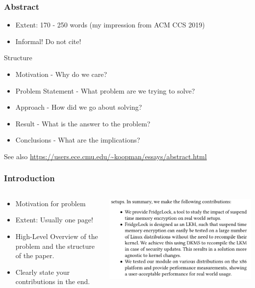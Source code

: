 \documentclass[xcolor={usenames,dvipsnames}]{beamer}
\begin{document}
\begin{frame}
	\frametitle{Abstract}

	\begin{itemize}
		\item Extent: \alert{170 - 250 words} (my impression from ACM CCS 2019)
		\item Informal! Do not cite!
	\end{itemize}

	Structure
	\begin{itemize}
		\item Motivation - Why do we care?
		\item Problem Statement - What problem are we trying to solve?
		\item Approach - How did we go about solving?
		\item Result - What is the answer to the problem?
		\item Conclusions - What are the implications?
	\end{itemize}

	{\footnotesize See also \url{https://users.ece.cmu.edu/~koopman/essays/abstract.html}}
\end{frame}

\begin{frame}
	\frametitle{Introduction}

	\begin{columns}
		\begin{column}{0.5\textwidth}
			\begin{itemize}
				\item Motivation for problem
				\item Extent: Usually \alert{one} page!
				\item High-Level Overview of the problem and the structure of the paper.
				\item Clearly state your \alert{contributions} in the end.
			\end{itemize}
		\end{column}
		\begin{column}{0.5\textwidth}
			\includegraphics[width=\linewidth]{contributions.png}
		\end{column}
	\end{columns}
\end{frame}
\end{document}
